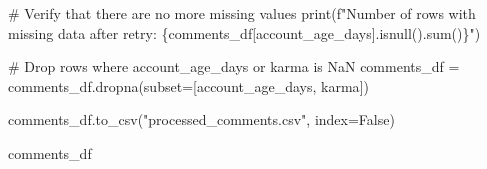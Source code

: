 \documentclass[
  12pt,
  letterpaper,
  DIV=11,
  numbers=noendperiod]{scrartcl}
\newenvironment{Shaded}{\begin{snugshade}}{\end{snugshade}}
\newcommand{\BuiltInTok}[1]{\textcolor[rgb]{0.00,0.23,0.31}{#1}}
\newcommand{\CommentTok}[1]{\textcolor[rgb]{0.37,0.37,0.37}{#1}}
\newcommand{\NormalTok}[1]{\textcolor[rgb]{0.00,0.23,0.31}{#1}}
\newcommand{\OperatorTok}[1]{\textcolor[rgb]{0.37,0.37,0.37}{#1}}
\newcommand{\SpecialCharTok}[1]{\textcolor[rgb]{0.37,0.37,0.37}{#1}}
\newcommand{\SpecialStringTok}[1]{\textcolor[rgb]{0.13,0.47,0.30}{#1}}
\newcommand{\StringTok}[1]{\textcolor[rgb]{0.13,0.47,0.30}{#1}}
\newcommand{\VariableTok}[1]{\textcolor[rgb]{0.07,0.07,0.07}{#1}}
\begin{document}
\begin{Shaded}
\begin{Highlighting}[]
\CommentTok{\# Verify that there are no more missing values}
\BuiltInTok{print}\NormalTok{(}\SpecialStringTok{f"Number of rows with missing data after retry: }\SpecialCharTok{\{}\NormalTok{comments\_df[}\StringTok{\textquotesingle{}account\_age\_days\textquotesingle{}}\NormalTok{]}\SpecialCharTok{.}\NormalTok{isnull()}\SpecialCharTok{.}\BuiltInTok{sum}\NormalTok{()}\SpecialCharTok{\}}\SpecialStringTok{"}\NormalTok{)}

\CommentTok{\# Drop rows where \textquotesingle{}account\_age\_days\textquotesingle{} or \textquotesingle{}karma\textquotesingle{} is NaN}
\NormalTok{comments\_df }\OperatorTok{=}\NormalTok{ comments\_df.dropna(subset}\OperatorTok{=}\NormalTok{[}\StringTok{\textquotesingle{}account\_age\_days\textquotesingle{}}\NormalTok{, }\StringTok{\textquotesingle{}karma\textquotesingle{}}\NormalTok{])}

\NormalTok{comments\_df.to\_csv(}\StringTok{"processed\_comments.csv"}\NormalTok{, index}\OperatorTok{=}\VariableTok{False}\NormalTok{)}

\NormalTok{comments\_df}
\end{Highlighting}
\end{Shaded}
\end{document}
